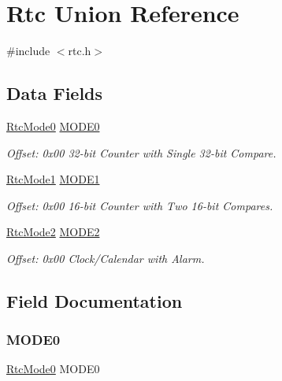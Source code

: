 \hypertarget{union_rtc}{}\section{Rtc Union Reference}
\label{union_rtc}


{\ttfamily \#include $<$rtc.\+h$>$}

\subsection*{Data Fields}
\begin{DoxyCompactItemize}
\item 
\mbox{\hyperlink{struct_rtc_mode0}{Rtc\+Mode0}} \mbox{\hyperlink{union_rtc_a490318a0b9aa7182ec4b618c183dca0d}{M\+O\+D\+E0}}
\begin{DoxyCompactList}\small\item\em Offset\+: 0x00 32-\/bit Counter with Single 32-\/bit Compare. \end{DoxyCompactList}\item 
\mbox{\hyperlink{struct_rtc_mode1}{Rtc\+Mode1}} \mbox{\hyperlink{union_rtc_af01b4de34aea9016b3e06fe48dc86c7a}{M\+O\+D\+E1}}
\begin{DoxyCompactList}\small\item\em Offset\+: 0x00 16-\/bit Counter with Two 16-\/bit Compares. \end{DoxyCompactList}\item 
\mbox{\hyperlink{struct_rtc_mode2}{Rtc\+Mode2}} \mbox{\hyperlink{union_rtc_a8a9d81cb0c4e27522805b10cd2c4bb76}{M\+O\+D\+E2}}
\begin{DoxyCompactList}\small\item\em Offset\+: 0x00 Clock/\+Calendar with Alarm. \end{DoxyCompactList}\end{DoxyCompactItemize}


\subsection{Field Documentation}
\mbox{\label{union_rtc_a490318a0b9aa7182ec4b618c183dca0d}} 
\subsubsection{\texorpdfstring{MODE0}{MODE0}}
{\footnotesize\ttfamily \mbox{\hyperlink{struct_rtc_mode0}{Rtc\+Mode0}} M\+O\+D\+E0}



